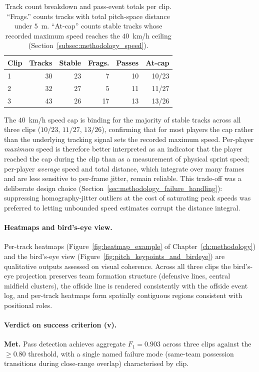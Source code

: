 \begin{table}[h]
\centering
\small
\begin{tabular}{lrrrrr}
\toprule
Clip & Tracks & Stable & Frags. & Passes & At-cap \\
\midrule
1 & 30 & 23 & 7  & 10 & 10/23 \\
2 & 32 & 27 & 5  & 11 & 11/27 \\
3 & 43 & 26 & 17 & 13 & 13/26 \\
\bottomrule
\end{tabular}
\caption[Per-clip tactical-output summary.]{Track count breakdown
and pass-event totals per clip. ``Frags.'' counts tracks with total
pitch-space distance under $5$~m. ``At-cap'' counts stable tracks
whose recorded maximum speed reaches the $40$~km/h ceiling
(Section~\ref{subsec:methodology_speed}).}
\label{tab:tactical_stats}
\end{table}

The $40$~km/h speed cap is binding for the majority of stable
tracks across all three clips ($10/23$, $11/27$, $13/26$), confirming
that for most players the cap rather than the underlying tracking
signal sets the recorded maximum speed. Per-player \emph{maximum}
speed is therefore better interpreted as an indicator that the
player reached the cap during the clip than as a measurement of
physical sprint speed; per-player \emph{average} speed and total
distance, which integrate over many frames and are less sensitive
to per-frame jitter, remain reliable. This trade-off was a
deliberate design choice
(Section~\ref{sec:methodology_failure_handling}): suppressing
homography-jitter outliers at the cost of saturating peak speeds
was preferred to letting unbounded speed estimates corrupt the
distance integral.

\paragraph{Heatmaps and bird's-eye view.}
Per-track heatmaps (Figure~\ref{fig:heatmap_example} of
Chapter~\ref{ch:methodology}) and the bird's-eye view
(Figure~\ref{fig:pitch_keypoints_and_birdeye}) are qualitative
outputs assessed on visual coherence. Across all three clips the
bird's-eye projection preserves team formation structure (defensive
lines, central midfield clusters), the offside line is rendered
consistently with the offside event log, and per-track heatmaps form
spatially contiguous regions consistent with positional roles.

\paragraph{Verdict on success criterion (v).}
\textbf{Met.} Pass detection achieves aggregate $F_1 = 0.903$ across
three clips against the $\geq 0.80$ threshold, with a single named
failure mode (same-team possession transitions during close-range
overlap) characterised by clip.

